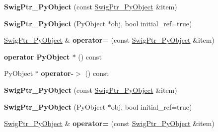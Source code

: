 \begin{DoxyCompactItemize}
\item 
\hypertarget{classswig_1_1SwigPtr__PyObject_a4282f20207f8cd22c9b079203c832a04}{
{\bfseries SwigPtr\_\-PyObject} (const \hyperlink{classswig_1_1SwigPtr__PyObject}{SwigPtr\_\-PyObject} \&item)}
\label{d2/d50/classswig_1_1SwigPtr__PyObject_a4282f20207f8cd22c9b079203c832a04}

\item 
\hypertarget{classswig_1_1SwigPtr__PyObject_a4503d58d577d209f5e1fa67026852505}{
{\bfseries SwigPtr\_\-PyObject} (PyObject $\ast$obj, bool initial\_\-ref=true)}
\label{d2/d50/classswig_1_1SwigPtr__PyObject_a4503d58d577d209f5e1fa67026852505}

\item 
\hypertarget{classswig_1_1SwigPtr__PyObject_a86d8657d6b4a27c8e9e6942bc1ba572c}{
\hyperlink{classswig_1_1SwigPtr__PyObject}{SwigPtr\_\-PyObject} \& {\bfseries operator=} (const \hyperlink{classswig_1_1SwigPtr__PyObject}{SwigPtr\_\-PyObject} \&item)}
\label{d2/d50/classswig_1_1SwigPtr__PyObject_a86d8657d6b4a27c8e9e6942bc1ba572c}

\item 
\hypertarget{classswig_1_1SwigPtr__PyObject_aa2f1cdba0651c7a52482d225faef0574}{
{\bfseries operator PyObject $\ast$} () const }
\label{d2/d50/classswig_1_1SwigPtr__PyObject_aa2f1cdba0651c7a52482d225faef0574}

\item 
\hypertarget{classswig_1_1SwigPtr__PyObject_a97a20cad6a2b0916f39c45555fb559f0}{
PyObject $\ast$ {\bfseries operator-\/$>$} () const }
\label{d2/d50/classswig_1_1SwigPtr__PyObject_a97a20cad6a2b0916f39c45555fb559f0}

\item 
\hypertarget{classswig_1_1SwigPtr__PyObject_a4282f20207f8cd22c9b079203c832a04}{
{\bfseries SwigPtr\_\-PyObject} (const \hyperlink{classswig_1_1SwigPtr__PyObject}{SwigPtr\_\-PyObject} \&item)}
\label{d2/d50/classswig_1_1SwigPtr__PyObject_a4282f20207f8cd22c9b079203c832a04}

\item 
\hypertarget{classswig_1_1SwigPtr__PyObject_a4503d58d577d209f5e1fa67026852505}{
{\bfseries SwigPtr\_\-PyObject} (PyObject $\ast$obj, bool initial\_\-ref=true)}
\label{d2/d50/classswig_1_1SwigPtr__PyObject_a4503d58d577d209f5e1fa67026852505}

\item 
\hypertarget{classswig_1_1SwigPtr__PyObject_a86d8657d6b4a27c8e9e6942bc1ba572c}{
\hyperlink{classswig_1_1SwigPtr__PyObject}{SwigPtr\_\-PyObject} \& {\bfseries operator=} (const \hyperlink{classswig_1_1SwigPtr__PyObject}{SwigPtr\_\-PyObject} \&item)}
\label{d2/d50/classswig_1_1SwigPtr__PyObject_a86d8657d6b4a27c8e9e6942bc1ba572c}


\end{DoxyCompactItemize}
